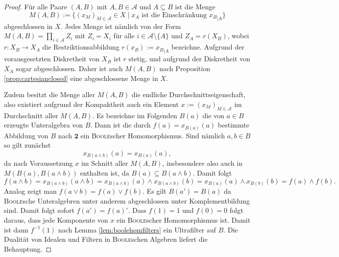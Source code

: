 \begin{proof}
  Für alle Paare $(A,B)$ mit $A,B \in \mathcal{A}$ und $A \subseteq B$ ist die Menge
  \begin{displaymath}
    M(A,B) := \{ (x_M)_{M \in \mathcal{A}} \in X \mid x_A \text{ ist die Einschränkung } {x_B}_{|A} \}
  \end{displaymath}
  abgeschlossen in $X$. 
  Jedes Menge ist nämlich von der Form $M(A,B) = \prod_{i \in \mathcal{A}} Z_i$ mit $Z_i = X_i$ für alle $i \in \mathcal{A} \setminus \{A\}$ und $Z_A = r(X_B)$, wobei $r \colon X_B \to X_A$ die Restriktionsabbildung $r(x_B) := {x_B}_{|A}$ bezeichne.
  Aufgrund der vorausgesetzten Diskretheit von $X_B$ ist $r$ stetig, und aufgrund der Diskretheit von $X_A$ sogar abgeschlossen.
  Daher ist auch $M(A,B)$ nach Proposition \ref{prop:cartesianclosed} eine abgeschlossene Menge in $X$.

  Zudem besitzt die Menge aller $M(A,B)$ die endliche Durchschnittseigenschaft, also existiert aufgrund der Kompaktheit auch ein Element $x := (x_M)_{M \in \mathcal{A}}$ im Durchschnitt aller $M(A,B)$.
  Es bezeichne im Folgenden $B(a)$ die von $a \in B$ erzeugte Unteralgebra von $B$.
  Dann ist die durch $f(a) = x_{B(a)}(a)$ bestimmte Abbildung von $B$ nach $\mathbf{2}$ ein \textsc{Boole}scher Homomorphismus.
  Sind nämlich $a,b \in B$ so gilt zunächst 
  \begin{displaymath}
    x_{B(a \land b)}(a) = x_{B(a)}(a),
  \end{displaymath}
  da nach Voraussetzung $x$ im Schnitt aller $M(A,B)$, insbesondere also auch in $M(B(a),B(a \land b))$ enthalten ist, da $B(a) \subseteq B(a \land b)$.
  Damit folgt
  \begin{displaymath}
    f(a \land b) 
    = x_{B(a \land b)}(a \land b)
    = x_{B(a \land b)}(a) \land x_{B(a \land b)}(b)
    = x_{B(a)}(a) \land x_{B(b)}(b)
    = f(a) \land f(b).
  \end{displaymath}
  Analog zeigt man $f(a \lor b) = f(a) \lor f(b)$.
  Es gilt $B(a') = B(a)$ da \textsc{Boole}sche Unteralgebren unter anderem abgeschlossen unter Komplementbildung sind.
  Damit folgt sofort $f(a') = f(a)'$.
  Dass $f(1) = 1$ und $f(0) = 0$ folgt daraus, dass jede Komponente von $x$ ein \textsc{Boole}scher Homomorphismus ist.
  Damit ist dann $f^{-1}(1)$ nach Lemma \ref{lem:boolehomfilters} ein Ultrafilter auf $B$.
  Die Dualität von Idealen und Filtern in \textsc{Boole}schen Algebren liefert die Behauptung.
\end{proof}


